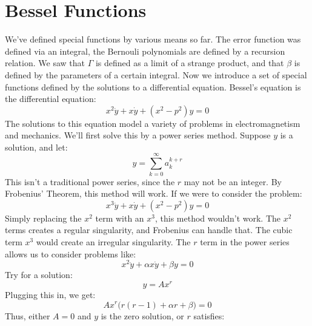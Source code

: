     \section{Bessel Functions}
        We've defined special functions by various means so far.
        The error function was defined via an integral, the
        Bernouli polynomials are defined by a recursion relation.
        We saw that $\Gamma$ is defined as a limit of a strange
        product, and that $\beta$ is defined by the parameters of
        a certain integral. Now we introduce a set of special
        functions defined by the solutions to a differential equation.
        Bessel's equation is the differential equation:
        \begin{equation}
            x^{2}\ddot{y}+x\dot{y}+(x^{2}-p^{2})y=0
        \end{equation}
        The solutions to this equation model a variety of problems
        in electromagnetism and mechanics. We'll first solve this
        by a power series method. Suppose $y$ is a solution, and let:
        \begin{equation}
            y=\sum_{k=0}^{\infty}a_{k}^{k+r}
        \end{equation}
        This isn't a traditional power series, since the $r$ may not
        be an integer. By Frobenius' Theorem, this method will work.
        If we were to consider the problem:
        \begin{equation}
            x^{3}\ddot{y}+x\dot{y}+(x^{2}-p^{2})y=0
        \end{equation}
        Simply replacing the $x^{2}$ term with an $x^{3}$, this method
        wouldn't work. The $x^{2}$ terms creates a regular
        singularity, and Frobenius can handle that. The cubic
        term $x^{3}$ would create an irregular singularity. The
        $r$ term in the power series allows us to consider problems
        like:
        \begin{equation}
            x^{2}\ddot{y}+\alpha{x}\dot{y}+\beta{y}=0
        \end{equation}
        Try for a solution:
        \begin{equation}
            y=Ax^{r}
        \end{equation}
        Plugging this in, we get:
        \begin{equation}
            Ax^{r}\big(r(r-1)+\alpha{r}+\beta\big)=0
        \end{equation}
        Thus, either $A=0$ and $y$ is the zero solution, or $r$
        satisfies:
